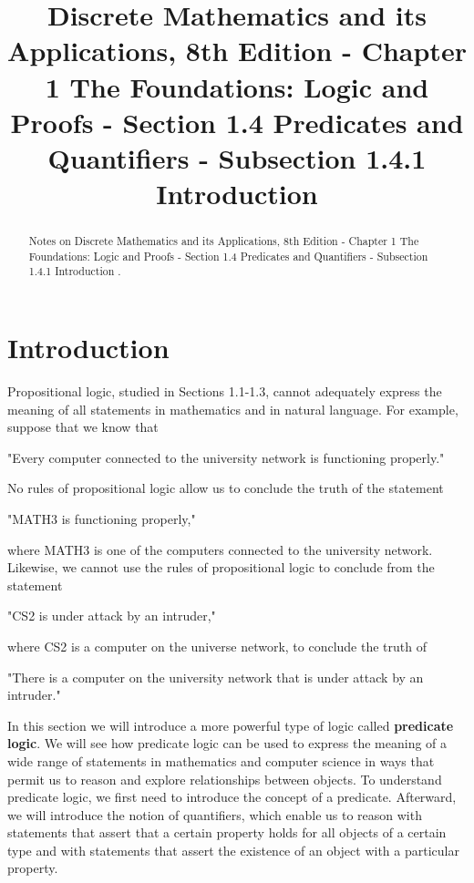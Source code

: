 \documentclass{Axon}
\title{Discrete Mathematics and its Applications, 8th Edition - Chapter 1 The Foundations: Logic and Proofs - Section 1.4 Predicates and Quantifiers - Subsection 1.4.1 Introduction}
\begin{document}
\maketitle
\makeauthor
\begin{abstract}
Notes on Discrete Mathematics and its Applications, 8th Edition - Chapter 1 The Foundations: Logic and Proofs - Section 1.4 Predicates and Quantifiers - Subsection 1.4.1 Introduction \cite{Rosen}.
\end{abstract}
\section{Introduction}
Propositional logic, studied in Sections 1.1-1.3, cannot adequately express the meaning of all statements in mathematics and in natural language. For example, suppose that we know that

\begin{center}
    "Every computer connected to the university network is functioning properly."
\end{center}

No rules of propositional logic allow us to conclude the truth of the statement

\begin{center}
    "MATH3 is functioning properly,"
\end{center}

where MATH3 is one of the computers connected to the university network. Likewise, we cannot use the rules of propositional logic to conclude from the statement

\begin{center}
    "CS2 is under attack by an intruder,"
\end{center}

where CS2 is a computer on the universe network, to conclude the truth of

\begin{center}
    "There is a computer on the university network that is under attack by an intruder."
\end{center}

In this section we will introduce a more powerful type of logic called \textbf{predicate logic}. We will see how predicate logic can be used to express the meaning of a wide range of statements in mathematics and computer science in ways that permit us to reason and explore relationships between objects. To understand predicate logic, we first need to introduce the concept of a predicate. Afterward, we will introduce the notion of quantifiers, which enable us to reason with statements that assert that a certain property holds for all objects of a certain type and with statements that assert the existence of an object with a particular property.

\printbibliography
\end{document}
